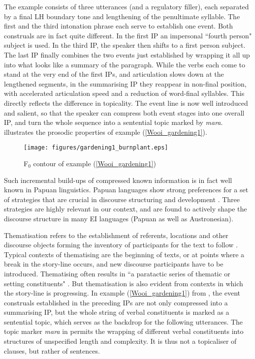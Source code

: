 The example consists of three utterances (and a regulatory filler), each separated by a final LH boundary tone and lengthening of the penultimate syllable. The first and the third intonation phrase each serve to establish one event. Both construals are in fact quite different. In the first IP an impersonal ``fourth person" subject is used. In the third IP, the speaker then shifts to a first person subject. The last IP finally combines the two events just established by wrapping it all up into what looks like a summary of the paragraph. While the verbs each come to stand at the very end of the first IPs, and articulation slows down at the lengthened segments, in the summarising IP they reappear in non-final position, with accelerated articulation speed and a reduction of word-final syllables. This directly reflects the difference in topicality. The event line is now well introduced and salient, so that the speaker can compress both event stages into one overall IP, and turn the whole sequence into a sentential topic marked by \textit{mara}.  illustrates the prosodic properties of example (\ref{Wooi_gardening1}).

\begin{figure}
\texttt{[image: figures/gardening1\_burnplant.eps]}
\caption{F$_0$ contour of example (\ref{Wooi_gardening1})}\label{fig:gardening_pitch}
\end{figure}

Such incremental build-ups of compressed known information is in fact well known in Papuan linguistics. Papuan languages show strong preferences for a set of strategies that are crucial in discourse structuring and development \citep{devries2005towards, devries2006areal}. Three strategies are highly relevant in our context, and are found to actively shape the discourse structure in many EI languages (Papuan as well as Austronesian).

Thematisation refers to the establishment of referents, locations and other discourse objects forming the inventory of participants for the text to follow \citep{heeschen1998eipo, devries2006areal}. Typical contexts of thematising are the beginning of texts, or at points where a break in the story-line occurs, and new discourse participants have to be introduced. Thematising often results in ``a paratactic series of thematic or setting constituents" \citep[814]{devries2006areal}. But thematisation is also evident from contexts  in which the story-line is progressing. In example (\ref{Wooi_gardening1}) from , the event construals established in the preceding IPs are not only compressed into a summarising IP, but the whole string of verbal constituents is marked as a sentential topic, which serves as the backdrop for the following utterances. The topic marker \textit{mara} in  permits the wrapping of different verbal constituents into structures of unspecified length and complexity. It is thus not a topicaliser of clauses, but rather of sentences.

